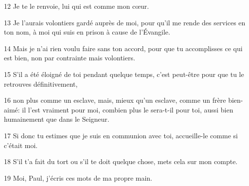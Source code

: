 
12 Je te le renvoie, lui qui est comme mon cœur.

13 Je l’aurais volontiers gardé auprès de moi, pour qu’il me rende des services en ton nom, à moi qui suis en prison à cause de l’Évangile.

14 Mais je n’ai rien voulu faire sans ton accord, pour que tu accomplisses ce qui est bien, non par contrainte mais volontiers.

15 S’il a été éloigné de toi pendant quelque temps, c’est peut-être pour que tu le retrouves définitivement,

16 non plus comme un esclave, mais, mieux qu’un esclave, comme un frère bien-aimé: il l’est vraiment pour moi, combien plus le sera-t-il pour toi, aussi bien humainement que dans le Seigneur.

17 Si donc tu estimes que je suis en communion avec toi, accueille-le comme si c’était moi.

18 S’il t’a fait du tort ou s’il te doit quelque chose, mets cela sur mon compte.

19 Moi, Paul, j’écris ces mots de ma propre main.